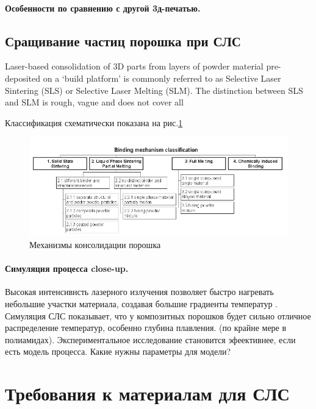 \paragraph{Особенности по сравнению с другой 3д-печатью.}

\subsection{Сращивание частиц порошка при СЛС}
Laser-based consolidation of 3D parts from layers of
powder material pre-deposited on a ‘build platform’ is
commonly referred to as Selective Laser Sintering (SLS)
or Selective Laser Melting (SLM). The distinction between
SLS and SLM is rough, vague and does not cover all

Классификация схематически показана на рис.\ref{fig:binding}

\begin{figure}[h]
    \centering
    \includegraphics[width = \linewidth]{fig/binding.PNG}
    \caption{Механизмы консолидации порошка}
    \label{fig:binding}
\end{figure}

\paragraph{Симуляция процесса close-up.}


Высокая интенсивнсть лазерного излучения позволяет быстро нагревать небольшие участки материала, создавая большие градиенты температур \cite{sls-sim2016}.
\\
Симуляция СЛС показывает, что у композитных порошков будет сильно отличное распределение температур, особенно глубина плавления. (по крайне мере в полиамидах)\cite{sls-sim2016}. Экспериментальное исследование становится эфеективнее, если есть модель процесса.
Какие нужны параметры для модели?

\section{Требования к материалам для СЛС}





